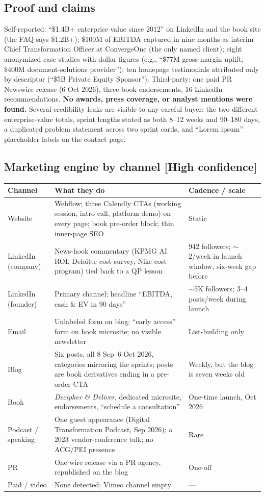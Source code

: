 \documentclass[11pt]{article}
\newcommand{\high}{\textcolor{green!45!black}{\textbf{[High confidence]}}}
\begin{document}
\subsection{Proof and claims}
Self-reported: ``\$1.4B+ enterprise value since 2012'' on LinkedIn and the book site
(the FAQ says \$1.2B+); \$100M of EBITDA captured in nine months as interim Chief
Transformation Officer at ConvergeOne (the only named client); eight anonymized case
studies with dollar figures (e.g., ``\$77M gross-margin uplift, \$400M document-solutions
provider''); ten homepage testimonials attributed only by descriptor (``\$5B Private
Equity Sponsor''). Third-party: one paid PR Newswire release (6 Oct 2026), three book
endorsements, 16 LinkedIn recommendations. \textbf{No awards, press coverage, or
analyst mentions were found.} Several credibility leaks are visible to any careful
buyer: the two different enterprise-value totals, sprint lengths stated as both 8--12
weeks and 90--180 days, a duplicated problem statement across two sprint cards, and
``Lorem ipsum'' placeholder labels on the contact page.

\subsection{Marketing engine by channel \high}
\begin{center}
\renewcommand{\arraystretch}{1.25}
\small
\begin{tabular}{R{2.6cm} R{6.4cm} R{4.2cm}}
\toprule
\textbf{Channel} & \textbf{What they do} & \textbf{Cadence / scale} \\
\midrule
Website & Webflow; three Calendly CTAs (working session, intro call, platform demo)
on every page; book pre-order block; thin inner-page SEO & Static \\
LinkedIn (company) & News-hook commentary (KPMG AI ROI, Deloitte cost survey, Nike
cost program) tied back to a QP lesson & 942 followers; $\sim$2/week in launch window,
six-week gap before \\
LinkedIn (founder) & Primary channel; headline ``EBITDA, cash \& EV in 90 days'' &
$\sim$5K followers; 3--4 posts/week during launch \\
Email & Unlabeled form on blog; ``early access'' form on book microsite; no visible
newsletter & List-building only \\
Blog & Six posts, all 8 Sep--6 Oct 2026, categories mirroring the sprints; posts are
book derivatives ending in a pre-order CTA & Weekly, but the blog is seven weeks old \\
Book & \emph{Decipher \& Deliver}, dedicated microsite, endorsements, ``schedule a
consultation'' & One-time launch, Oct 2026 \\
Podcast / speaking & One guest appearance (Digital Transformation Podcast, Sep 2026); a
2023 vendor-conference talk; no ACG/PEI presence & Rare \\
PR & One wire release via a PR agency, republished on the blog & One-off \\
Paid / video & None detected; Vimeo channel empty & --- \\
\bottomrule
\end{tabular}
\end{center}
\end{document}
